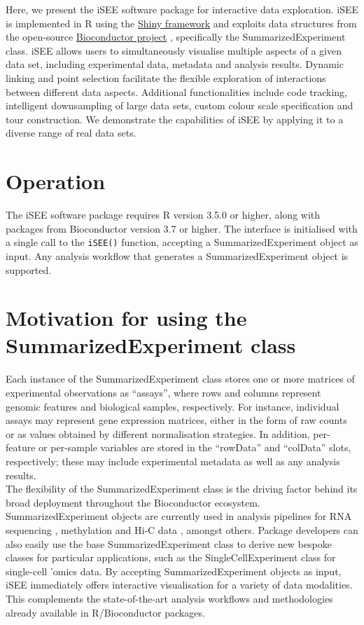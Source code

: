 \documentclass[10pt,a4paper,twocolumn]{article}
\begin{document}
Here, we present the iSEE software package for interactive data exploration.
iSEE is implemented in R using the \href{https://shiny.rstudio.com/}{Shiny framework}  \citep{chang2017shiny} and exploits data structures from the open-source \href{https://www.bioconductor.org/}{Bioconductor project}  \citep{gentleman2004bioconductor}, specifically the SummarizedExperiment class.
iSEE allows users to simultaneously visualise multiple aspects of a given data set, including experimental data, metadata and analysis results.
Dynamic linking and point selection facilitate the flexible exploration of interactions between different data aspects.
Additional functionalities include code tracking, intelligent downsampling of large data sets, custom colour scale specification and tour construction.
We demonstrate the capabilities of iSEE by applying it to a diverse range of real data sets.

\section*{Operation}
The iSEE software package requires R version 3.5.0 or higher, along with packages from Bioconductor version 3.7 or higher.
The interface is initialised with a single call to the \texttt{iSEE()} function, accepting a SummarizedExperiment object \citep{huber2015orchestrating} as input.
Any analysis workflow that generates a SummarizedExperiment object is supported.

\section*{Motivation for using the SummarizedExperiment class}
Each instance of the SummarizedExperiment class stores one or more matrices of experimental observations as ``assays'', where rows and columns represent genomic features and biological samples, respectively.
For instance, individual assays may represent gene expression matrices, either in the form of raw counts or as values obtained by different normalisation strategies.
In addition, per-feature or per-sample variables are stored in the ``rowData'' and ``colData'' slots, respectively; these may include experimental metadata as well as any analysis results.\\

The flexibility of the SummarizedExperiment class is the driving factor behind its broad deployment throughout the Bioconductor ecosystem.
SummarizedExperiment objects are currently used in analysis pipelines for RNA sequencing \citep{love2014moderated}, methylation \citep{aryee2014minfi} and Hi-C data \citep{lun2016infrastructure}, amongst others.
Package developers can also easily use the base SummarizedExperiment class to derive new bespoke classes for particular applications, such as the SingleCellExperiment class for single-cell 'omics data.
By accepting SummarizedExperiment objects as input, iSEE immediately offers interactive visualisation for a variety of data modalities.
This complements the state-of-the-art analysis workflows and methodologies already available in R/Bioconductor packages. \\
\end{document}
